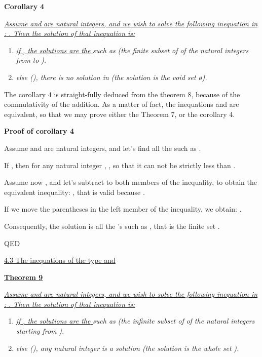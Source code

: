 \documentclass{article}
\providecommand{\tightlist}{%
  \setlength{\itemsep}{0pt}\setlength{\parskip}{0pt}}
\begin{document}
\textbf{Corollary }\textbf{4}

\ul{\emph{Assume }}\ul{\emph{ and }}\ul{\emph{ are natural integers, and we wish to solve the following inequation in }}\ul{\emph{: }}\ul{\emph{. Then the solution of that inequation is:}}

\begin{enumerate}
\tightlist
\item \ul{\emph{if }}\ul{\emph{, the solutions are the }}\emph{ such as }\emph{ (the finite subset of }\emph{ of the natural integers from }\emph{ to }\emph{).}
\item \emph{else (}\emph{), there is no solution in }\emph{ (the solution is the void set }\emph{ø}\emph{).}
\end{enumerate}

The corollary 4 is straight-fully deduced from the theorem 8, because of the commutativity of the addition. As a matter of fact, the inequations  and  are equivalent, so that we may prove either the Theorem 7, or the corollary 4.

\textbf{Proof of corollary 4}

Assume  and  are natural integers, and let’s find all the  such as .

If , then for any natural integer , , so that it can not be strictly less than .

Assume now , and let’s subtract  to both members of the inequality, to obtain the equivalent inequality: , that is valid because .

If we move the parentheses in the left member of the inequality, we obtain: .

Consequently, the solution is all the ’s such as , that is the finite set .

QED

\ul{4.3 The inequations of the type }\ul{ and }

\ul{\textbf{Theorem 9}}

\ul{\emph{Assume }}\ul{\emph{ and }}\ul{\emph{ are natural integers, and we wish to solve the following inequation in }}\ul{\emph{: }}\ul{\emph{. Then the solution of that inequation is:}}

\begin{enumerate}
\tightlist
\item \ul{\emph{if }}\ul{\emph{, the solutions are the }}\emph{ such as }\emph{ (the infinite subset of }\emph{ of the natural integers starting from }\emph{).}
\item \emph{else (}\emph{), any natural integer }\emph{ is a solution (the solution is the whole set }\emph{).}
\end{enumerate}
\end{document}
